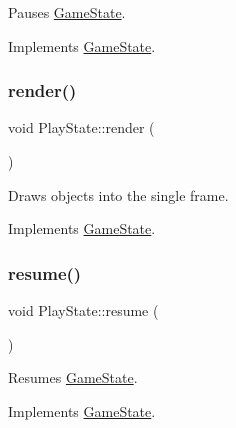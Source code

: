 Pauses \mbox{\hyperlink{class_game_state}{Game\+State}}. 



Implements \mbox{\hyperlink{class_game_state_aafc908582760099891b37bb380ddd87a}{Game\+State}}.

\mbox{\label{class_play_state_a186b8cb25c420e2ce54002bcb08d8bee}} 
\subsubsection{\texorpdfstring{render()}{render()}}
{\footnotesize\ttfamily void Play\+State\+::render (\begin{DoxyParamCaption}\item[{\mbox{\hyperlink{class_game_engine}{Game\+Engine}} $\ast$}]{ }\end{DoxyParamCaption})\hspace{0.3cm}{\ttfamily [virtual]}}



Draws objects into the single frame. 



Implements \mbox{\hyperlink{class_game_state_a0d56cd5355f59a87cf95e1c6d719f329}{Game\+State}}.

\mbox{\label{class_play_state_ad4dda6c0b72ce34bd9caaade8a5562b9}} 
\subsubsection{\texorpdfstring{resume()}{resume()}}
{\footnotesize\ttfamily void Play\+State\+::resume (\begin{DoxyParamCaption}{ }\end{DoxyParamCaption})\hspace{0.3cm}{\ttfamily [virtual]}}



Resumes \mbox{\hyperlink{class_game_state}{Game\+State}}. 



Implements \mbox{\hyperlink{class_game_state_a4a421c44f4dae6e9a4fbe10b6e8c47ac}{Game\+State}}.

\mbox{\label{class_play_state_ad784c6b3e75c68505df30d51ebce4523}} 
